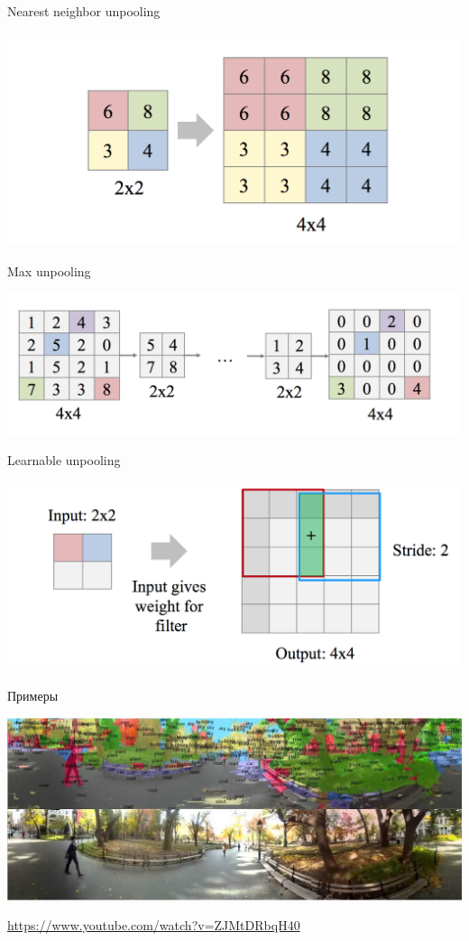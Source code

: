 \documentclass[notes,12pt, aspectratio=169]{beamer}
\begin{document}
\begin{frame}{Nearest neighbor unpooling}
\begin{center}
\includegraphics[width=.9\linewidth]{nnun.png}
\end{center}
\end{frame}


\begin{frame}{Max unpooling}
\begin{center}
\includegraphics[width=.9\linewidth]{maxun.png}
\end{center}
\end{frame}


\begin{frame}{Learnable unpooling}
\begin{center}
\includegraphics[width=.9\linewidth]{leun.png}
\end{center}
\end{frame}


\begin{frame}{Примеры}
\begin{center}
	\includegraphics[width=.9\linewidth]{seg.png}
\end{center}
\url{https://www.youtube.com/watch?v=ZJMtDRbqH40}
\end{frame}
\end{document}
